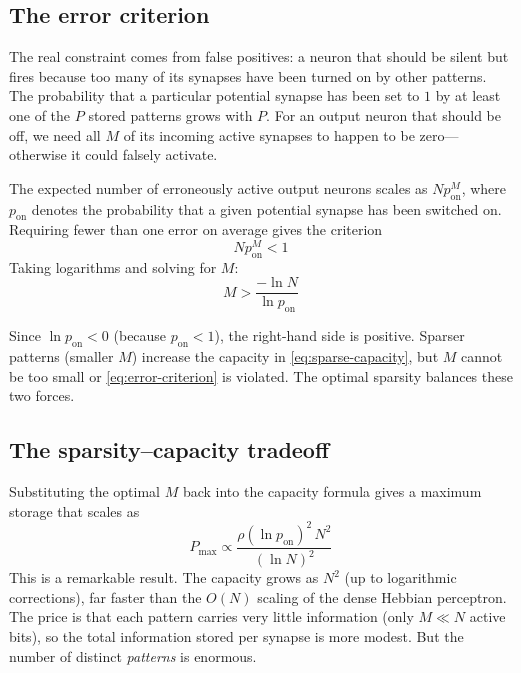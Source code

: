\subsection{The error criterion}

The real constraint comes from false positives: a neuron that should be silent but fires because too many of its synapses have been turned on by other patterns. The probability that a particular potential synapse has been set to $1$ by at least one of the $P$ stored patterns grows with $P$. For an output neuron that should be off, we need all $M$ of its incoming active synapses to happen to be zero---otherwise it could falsely activate.

The expected number of erroneously active output neurons scales as $N p_{\text{on}}^M$, where $p_{\text{on}}$ denotes the probability that a given potential synapse has been switched on. Requiring fewer than one error on average gives the criterion
%
\begin{equation}
  N p_{\text{on}}^M < 1
  \label{eq:error-criterion}
\end{equation}
%
Taking logarithms and solving for $M$:
%
\begin{equation}
  M > \frac{-\ln N}{\ln p_{\text{on}}}
  \label{eq:min-sparsity}
\end{equation}

\noindent Since $\ln p_{\text{on}} < 0$ (because $p_{\text{on}} < 1$), the right-hand side is positive. Sparser patterns (smaller $M$) increase the capacity in \cref{eq:sparse-capacity}, but $M$ cannot be too small or \cref{eq:error-criterion} is violated. The optimal sparsity balances these two forces.

\subsection{The sparsity--capacity tradeoff}

Substituting the optimal $M$ back into the capacity formula gives a maximum storage that scales as
%
\begin{equation}
  P_{\max} \propto \frac{\rho(\ln p_{\text{on}})^2\, N^2}{(\ln N)^2}
  \label{eq:max-capacity}
\end{equation}
%
This is a remarkable result. The capacity grows as $N^2$ (up to logarithmic corrections), far faster than the $O(N)$ scaling of the dense Hebbian perceptron. The price is that each pattern carries very little information (only $M \ll N$ active bits), so the total information stored per synapse is more modest. But the number of distinct \emph{patterns} is enormous.

